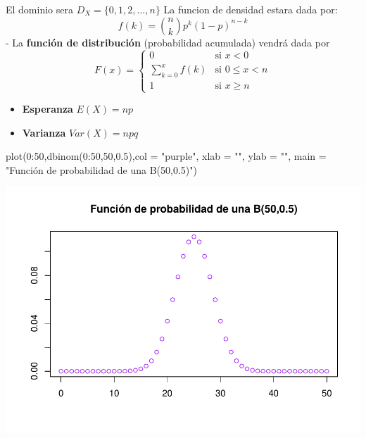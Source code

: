 \documentclass[
]{article}
\newenvironment{Shaded}{\begin{snugshade}}{\end{snugshade}}
\newcommand{\AttributeTok}[1]{\textcolor[rgb]{0.77,0.63,0.00}{#1}}
\newcommand{\DecValTok}[1]{\textcolor[rgb]{0.00,0.00,0.81}{#1}}
\newcommand{\FloatTok}[1]{\textcolor[rgb]{0.00,0.00,0.81}{#1}}
\newcommand{\FunctionTok}[1]{\textcolor[rgb]{0.00,0.00,0.00}{#1}}
\newcommand{\NormalTok}[1]{#1}
\newcommand{\SpecialCharTok}[1]{\textcolor[rgb]{0.00,0.00,0.00}{#1}}
\newcommand{\StringTok}[1]{\textcolor[rgb]{0.31,0.60,0.02}{#1}}
\providecommand{\tightlist}{%
  \setlength{\itemsep}{0pt}\setlength{\parskip}{0pt}}
\begin{document}
El dominio sera \(D_X = \{0,1,2,\dots,n\}\) La funcion de densidad
estara dada por: \[f(k) = {n\choose k}p^k(1-p)^{n-k} \] - La
\textbf{función de distribución} (probabilidad acumulada) vendrá dada
por \[F(x) = \left\{
\begin{array}{cl}
     0 & \text{si } x<0 
  \\ \sum_{k=0}^xf(k) & \text{si } 0\le x<n
  \\ 1 & \text{si } x\ge n
\end{array}
\right.\]

\begin{itemize}
\tightlist
\item
  \textbf{Esperanza} \(E(X) = np\)
\item
  \textbf{Varianza} \(Var(X) = npq\)
\end{itemize}

\begin{Shaded}
\begin{Highlighting}[]
\FunctionTok{plot}\NormalTok{(}\DecValTok{0}\SpecialCharTok{:}\DecValTok{50}\NormalTok{,}\FunctionTok{dbinom}\NormalTok{(}\DecValTok{0}\SpecialCharTok{:}\DecValTok{50}\NormalTok{,}\DecValTok{50}\NormalTok{,}\FloatTok{0.5}\NormalTok{),}\AttributeTok{col =} \StringTok{"purple"}\NormalTok{, }\AttributeTok{xlab =} \StringTok{""}\NormalTok{, }\AttributeTok{ylab =} \StringTok{""}\NormalTok{, }\AttributeTok{main =} \StringTok{"Función de probabilidad de una B(50,0.5)"}\NormalTok{)}
\end{Highlighting}
\end{Shaded}

\includegraphics{Teoria4_files/figure-latex/Ejemplos de distribucion binomial-1.pdf}
\end{document}
